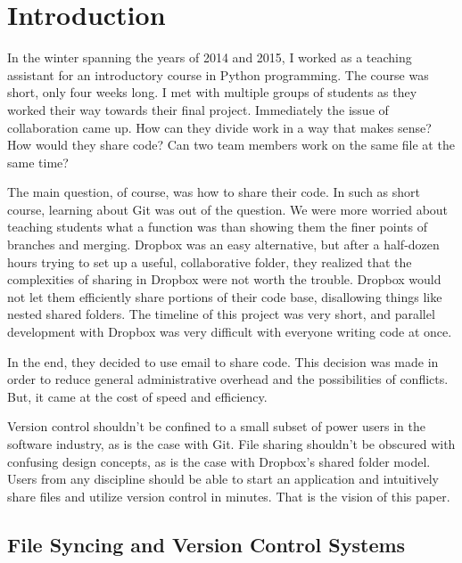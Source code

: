 \chapter{Introduction}

In the winter spanning the years of 2014 and 2015, I worked as a teaching assistant for an introductory course in Python programming. The course was short, only four weeks long. I met with multiple groups of students as they worked their way towards their final project. Immediately the issue of collaboration came up. How can they divide work in a way that makes sense? How would they share code? Can two team members work on the same file at the same time?

The main question, of course, was how to share their code. In such as short course, learning about Git was out of the question. We were more worried about teaching students what a function was than showing them the finer points of branches and merging. Dropbox was an easy alternative, but after a half-dozen hours trying to set up a useful, collaborative folder, they realized that the complexities of sharing in Dropbox were not worth the trouble. Dropbox would not let them efficiently share portions of their code base, disallowing things like nested shared folders. The timeline of this project was very short, and parallel development with Dropbox was very difficult with everyone writing code at once. 

In the end, they decided to use email to share code. This decision was made in order to reduce general administrative overhead and the possibilities of conflicts. But, it came at the cost of speed and efficiency.

Version control shouldn't be confined to a small subset of power users in the software industry, as is the case with Git. File sharing shouldn't be obscured with confusing design concepts, as is the case with Dropbox's shared folder model. Users from any discipline should be able to start an application and intuitively share files and utilize version control in minutes. That is the vision of this paper.

\section{File Syncing and Version Control Systems}

